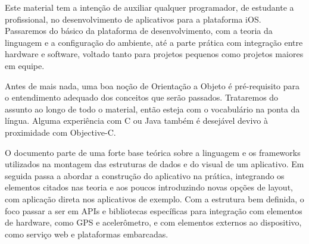 \documentclass[a4paper,12pt,brazil,oneside]{book}
\begin{document}
\listoffigures
{}
\thispagestyle{empty}

\listoftables
{}
\thispagestyle{empty}

\listoflistings
\thispagestyle{empty}



\thispagestyle{empty}

\doublespace

\pagestyle{body}


Este material tem a intenção de auxiliar qualquer programador, de estudante a profissional, no desenvolvimento de aplicativos para a plataforma iOS. Passaremos do básico da plataforma de desenvolvimento, com a teoria da linguagem e a configuração do ambiente, até a parte prática com integração entre hardware e software, voltado tanto para projetos pequenos como projetos maiores em equipe.

Antes de mais nada, uma boa noção de Orientação a Objeto é pré-requisito para o entendimento adequado dos conceitos que serão passados. Trataremos do assunto ao longo de todo o material, então esteja com o vocabulário na ponta da língua. Alguma experiência com C ou Java também é desejável devivo à proximidade com Objective-C.

O documento parte de uma forte base teórica sobre a linguagem e os frameworks utilizados na montagem das estruturas de dados e do visual de um aplicativo. Em seguida passa a abordar a construção do aplicativo na prática, integrando os elementos citados nas teoria e aos poucos introduzindo novas opções de layout, com aplicação direta nos aplicativos de exemplo. Com a estrutura bem definida, o foco passar a ser em APIs e bibliotecas específicas para integração com elementos de hardware, como GPS e acelerômetro, e com elementos externos ao dispositivo, como serviço web e plataformas embarcadas.
\end{document}
